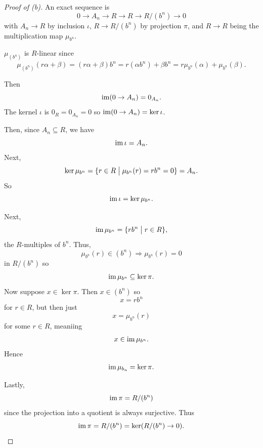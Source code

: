 \documentclass[11pt]{article}
\begin{document}
\begin{proof}[Proof of (b)]
    An exact sequence is 
    \[
        0 \to A_n \to R \to R \to R/(b^n) \to 0 
    \]
    with $A_n \to R$ by inclusion $\iota$, 
    $R \to R/(b^n)$ by projection $\pi$, and 
    $R \to R$ being the multiplication map 
    $\mu_{b^n}$. 

    $\mu_(b^n)$ is $R$-linear since 
    \[
        \mu_(b^n)(r\alpha+\beta) = 
        (r\alpha+\beta)b^n 
        = r(\alpha b^n) + \beta b^n 
        = r\mu_{b^n}(\alpha) + \mu_{b^n}(\beta). 
    \]

    Then 
    \[
        \operatorname{im}(0 \to A_n) = 0_{A_n}.  
    \]
    The kernel $\iota$ is $0_R = 0_{A_n} = 0$ so 
    $\operatorname{im}(0 \to A_n) = \ker \iota$. 
    
    Then, since $A_n \subseteq R$, we have 
    \[
        \operatorname{im} \iota = A_n. 
    \]
    Next, 
    \[
        \ker \mu_{b^n} 
        = \{r \in R \bigm| \mu_{b^n}(r) = rb^n = 0\} 
        = A_n. 
    \]
    So 
    \[
        \operatorname{im}\iota = \ker \mu_{b^n}. 
    \]

    Next, 
    \[
        \operatorname{im} \mu_{b^n} 
        = \{rb^n \bigm| r \in R\}, 
    \]
    the $R$-multiples of $b^n$.
    Thus, 
    \[
        \mu_{b^n}(r) \in (b^n) \Rightarrow \mu_{b^n}(r) = 0
    \]
    in $R/(b^n)$ so 
    \[
        \operatorname{im} \mu_{b^n} \subseteq \ker \pi.  
    \]
    Now suppose $x \in \ker \pi$. Then 
    $x \in (b^n)$ so 
    \[
        x = rb^n 
    \]
    for $r \in R$, but then just 
    \[
        x = \mu_{b^n}(r)
    \]
    for some $r\in R$, meaniing 
    \[
        x \in \operatorname{im} \mu_{b^n}. 
    \]
    Hence 
    \[
        \operatorname{im} \mu_{b_n} = \ker \pi. 
    \]

    Lastly, 
    \[
        \operatorname{im} \pi = R/(b^n)
    \]
    since the projection into a quotient is 
    always surjective. 
    Thus 
    \[
        \operatorname{im} \pi = R/(b^n) = \ker(R/(b^n) \to 0). 
    \]
\end{proof}
\end{document}
